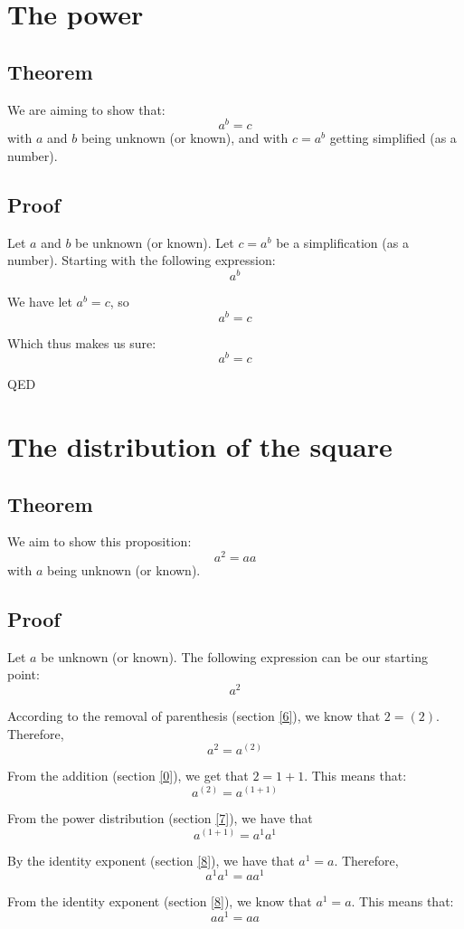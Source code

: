 \documentclass[a4paper]{article}
\begin{document}
\section{The power\label{2}}
\subsection{Theorem}
We are aiming to show that:
\[a^b = c\]
with $a$ and $b$ being unknown (or known), and with $c=a^b$ getting simplified (as a number).\subsection{Proof}
Let $a$ and $b$ be unknown (or known). Let $c=a^b$ be a simplification (as a number). Starting with the following expression:
\[a^b\]

We have let $a^b=c$, so
\[a^b=c\]

Which thus makes us sure:
\[a^b = c\]
\begin{flushright}
QED
\end{flushright}



\section{The distribution of the square\label{5}}
\subsection{Theorem}
We aim to show this proposition:
\[a^2 = aa\]
with $a$ being unknown (or known).\subsection{Proof}
Let $a$ be unknown (or known). The following expression can be our starting point:
\[a^2\]

According to the removal of parenthesis (section \ref{6}), we know that $2=\left(2\right)$. Therefore,
\[a^2=a^{\left(2\right)}\]

From the addition (section \ref{0}), we get that $2=1+1$. This means that:
\[a^{\left(2\right)}=a^{\left(1+1\right)}\]

From the power distribution (section \ref{7}), we have that
\[a^{\left(1+1\right)}=a^1a^1\]

By the identity exponent (section \ref{8}), we have that $a^1=a$. Therefore,
\[a^1a^1=aa^1\]

From the identity exponent (section \ref{8}), we know that $a^1=a$. This means that:
\[aa^1=aa\]
\end{document}
